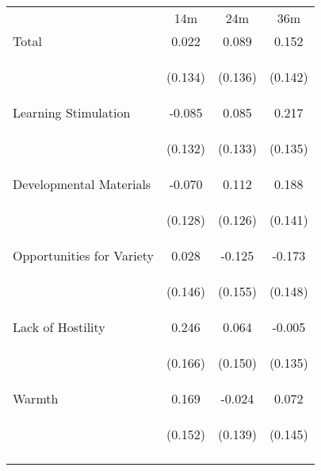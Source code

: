 \begin{tabular}{lccc}
\hline \noalign{\smallskip} & 14m & 24m & 36m\\
\noalign{\smallskip}\hline \noalign{\smallskip}Total & 0.022 & 0.089 & 0.152\\
 & \begin{footnotesize}(0.134)\end{footnotesize} & \begin{footnotesize}(0.136)\end{footnotesize} & \begin{footnotesize}(0.142)\end{footnotesize}\\
\noalign{\smallskip}Learning Stimulation & -0.085 & 0.085 & 0.217\\
 & \begin{footnotesize}(0.132)\end{footnotesize} & \begin{footnotesize}(0.133)\end{footnotesize} & \begin{footnotesize}(0.135)\end{footnotesize}\\
\noalign{\smallskip}Developmental Materials & -0.070 & 0.112 & 0.188\\
 & \begin{footnotesize}(0.128)\end{footnotesize} & \begin{footnotesize}(0.126)\end{footnotesize} & \begin{footnotesize}(0.141)\end{footnotesize}\\
\noalign{\smallskip}Opportunities for Variety & 0.028 & -0.125 & -0.173\\
 & \begin{footnotesize}(0.146)\end{footnotesize} & \begin{footnotesize}(0.155)\end{footnotesize} & \begin{footnotesize}(0.148)\end{footnotesize}\\
\noalign{\smallskip}Lack of Hostility & 0.246 & 0.064 & -0.005\\
 & \begin{footnotesize}(0.166)\end{footnotesize} & \begin{footnotesize}(0.150)\end{footnotesize} & \begin{footnotesize}(0.135)\end{footnotesize}\\
\noalign{\smallskip}Warmth & 0.169 & -0.024 & 0.072\\
 & \begin{footnotesize}(0.152)\end{footnotesize} & \begin{footnotesize}(0.139)\end{footnotesize} & \begin{footnotesize}(0.145)\end{footnotesize}\\
\noalign{\smallskip}\hline\end{tabular}\\
